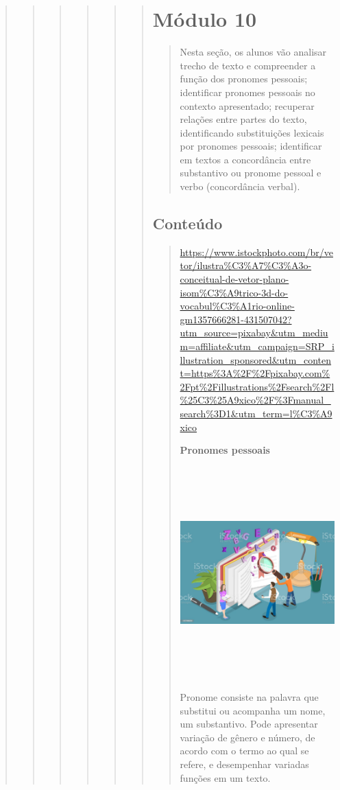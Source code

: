 \begin{quote}
\begin{quote}
\begin{quote}
\begin{quote}
\begin{quote}
\begin{quote}
\section{Módulo 10}\label{muxf3dulo-10}

\begin{quote}
Nesta seção, os alunos vão analisar trecho de texto e compreender a
função dos pronomes pessoais; identificar pronomes pessoais no contexto
apresentado; recuperar relações entre partes do texto, identificando
substituições lexicais por pronomes pessoais; identificar em textos a
concordância entre substantivo ou pronome pessoal e verbo (concordância
verbal).
\end{quote}

\subsection{Conteúdo}\label{conteuxfado-9}

\begin{quote}
\url{https://www.istockphoto.com/br/vetor/ilustra\%C3\%A7\%C3\%A3o-conceitual-de-vetor-plano-isom\%C3\%A9trico-3d-do-vocabul\%C3\%A1rio-online-gm1357666281-431507042?utm_source=pixabay\&utm_medium=affiliate\&utm_campaign=SRP_illustration_sponsored\&utm_content=https\%3A\%2F\%2Fpixabay.com\%2Fpt\%2Fillustrations\%2Fsearch\%2Fl\%25C3\%25A9xico\%2F\%3Fmanual_search\%3D1\&utm_term=l\%C3\%A9xico}

\textbf{Pronomes pessoais}

\includegraphics[width=4.81250in,height=3.20531in]{media/image33.jpeg}

Pronome consiste na palavra que substitui ou acompanha um nome, um
substantivo. Pode apresentar variação de gênero e número, de acordo com
o termo ao qual se refere, e desempenhar variadas funções em um texto.


\end{quote}
\end{quote}
\end{quote}
\end{quote}
\end{quote}
\end{quote}
\end{quote}

